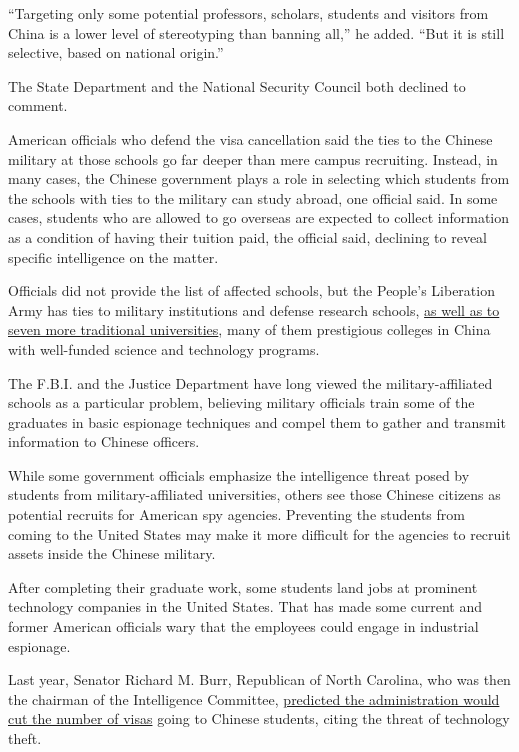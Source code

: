 ``Targeting only some potential professors, scholars, students and
visitors from China is a lower level of stereotyping than banning all,''
he added. ``But it is still selective, based on national origin.''

The State Department and the National Security Council both declined to
comment.

American officials who defend the visa cancellation said the ties to the
Chinese military at those schools go far deeper than mere campus
recruiting. Instead, in many cases, the Chinese government plays a role
in selecting which students from the schools with ties to the military
can study abroad, one official said. In some cases, students who are
allowed to go overseas are expected to collect information as a
condition of having their tuition paid, the official said, declining to
reveal specific intelligence on the matter.

Officials did not provide the list of affected schools, but the People's
Liberation Army has ties to military institutions and defense research
schools,
\href{https://www.aspi.org.au/report/china-defence-universities-tracker}{as
well as to seven more traditional universities}, many of them
prestigious colleges in China with well-funded science and technology
programs.

The F.B.I. and the Justice Department have long viewed the
military-affiliated schools as a particular problem, believing military
officials train some of the graduates in basic espionage techniques and
compel them to gather and transmit information to Chinese officers.

While some government officials emphasize the intelligence threat posed
by students from military-affiliated universities, others see those
Chinese citizens as potential recruits for American spy agencies.
Preventing the students from coming to the United States may make it
more difficult for the agencies to recruit assets inside the Chinese
military.

After completing their graduate work, some students land jobs at
prominent technology companies in the United States. That has made some
current and former American officials wary that the employees could
engage in industrial espionage.

Last year, Senator Richard M. Burr, Republican of North Carolina, who
was then the chairman of the Intelligence Committee,
\href{https://www.nytimes3xbfgragh.onion/2019/02/06/us/politics/richard-burr-china-huawei-5g.html}{predicted
the administration would cut the number of visas} going to Chinese
students, citing the threat of technology theft.


